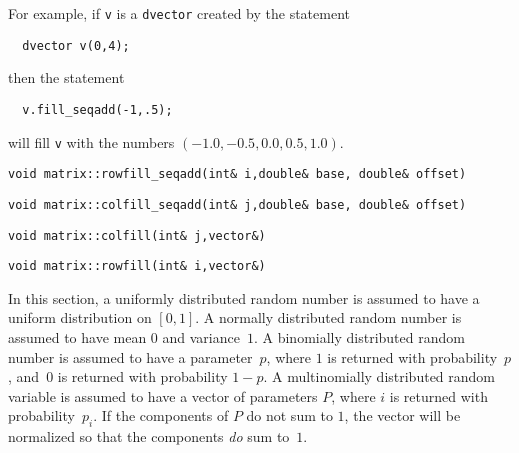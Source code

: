 \documentclass{admbmanual}
\begin{document}
For example, if \texttt{v} is a \texttt{dvector} created by the statement
\begin{lstlisting}
  dvector v(0,4);
\end{lstlisting}
then the statement
\begin{lstlisting}
  v.fill_seqadd(-1,.5);
\end{lstlisting}
will fill \texttt{v} with the numbers $(-1.0,-0.5,0.0,0.5,1.0)$.

\begin{lstlisting}
void matrix::rowfill_seqadd(int& i,double& base, double& offset)
\end{lstlisting}

\begin{lstlisting}
void matrix::colfill_seqadd(int& j,double& base, double& offset)
\end{lstlisting}

\begin{lstlisting}
void matrix::colfill(int& j,vector&)
\end{lstlisting}

\begin{lstlisting}
void matrix::rowfill(int& i,vector&)
\end{lstlisting}

In this section, a uniformly distributed random number is assumed to have a
uniform distribution on $[0,1]$. A normally distributed random number is assumed
to have mean $0$ and variance~$1$. A binomially distributed random number is
assumed to have a parameter~$p$, where $1$ is returned with probability~$p$,
and~$0$ is returned with probability $1-p$. A multinomially distributed random
variable is assumed to have a vector of parameters $P$, where $i$ is returned
with probability~$p_i$. If the components of $P$ do not sum to $1$, the vector
will be normalized so that the components \textit{do} sum to~$1$.
\end{document}
